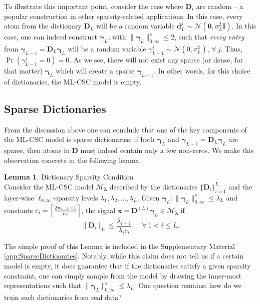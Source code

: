 \documentclass[10pt,journal]{IEEEtran}
\def\x{{\mathbf x}}
\def\d{{\mathbf d}}
\def\D{{\mathbf D}}
\def\M{{\mathcal{M}}}
\def\gama{{\boldsymbol \gamma}}
\def\lamda{{\boldsymbol \lambda}}
\theoremstyle{plain}
\theoremstyle{definition}
\newtheorem{lemma}{Lemma}
\begin{document}
To illustrate this important point, consider the case where $\D_i$ are random -- a popular construction in other sparsity-related applications. In this case, every atom from the dictionary $\D_L$ will be a random variable $\d_L^j \sim \mathcal{N}(\mathbf{0},\sigma^2_L\mathbf{I})$. In this case, one can indeed construct $\gama_L$, with $\|\gama_{L}\|^s_{0,\infty} \leq 2$, such that \emph{every entry} from $\gama_{L-1} = \D_L\gama_L$ will be a random variable $\gamma^j_{L-1}\sim \mathcal{N}(0,\sigma^2_L)$, $\forall\ j$. Thus, $\Pr\left(\gamma^j_{L-1}=0\right)=0$. As we see, there will not exist any sparse (or dense, for that matter) $\gama_L$ which will create a sparse $\gama_{L-1}$. In other words, for this choice of dictionaries, the ML-CSC model is empty.

\subsection{Sparse Dictionaries}

From the discussion above one can conclude that one of the key components of the ML-CSC model is sparse dictionaries: if both $\gama_L$ and $\gama_{L-1} = \D_L\gama_L$ are sparse, then atoms in $\D$ must indeed contain only a few non-zeros. We make this observation concrete in the following lemma.

\begin{lemma}{Dictionary Sparsity Condition}\label{lemma:SparseDictionaries} \\
	Consider the ML-CSC model $\M_\lamda$ described by the dictionaries $\{\D_i\}_{i=1}^L$ and the layer-wise $\ell_{0,\infty}$-sparsity levels $\lambda_1,\lambda_2,\dots,\lambda_L$. Given $\gama_L : \|\gama_L\|^s_{0,\infty} \leq \lambda_L$ and constants $c_i = \Bigl\lceil \frac{2n_{i-1}-1}{n_i} \Bigr\rceil$, the signal $\x = \D^{(L)} \gama_L \in \M_\lamda$ if
	\begin{equation}
		\|\D_i\|_0 \leq \frac{\lambda_{i-1}}{\lambda_i c_i}, \quad \forall\ 1<i\leq L.
	\end{equation}
\end{lemma}

The simple proof of this Lemma is included in the Supplementary Material \ref{app:SparseDictioanries}. Notably, while this claim does not tell us if a certain model is empty, it does guarantee that if the dictionaries satisfy a given sparsity constraint, one can simply sample from the model by drawing the inner-most representations such that $\|\gama_L \|^s_{0,\infty}\leq \lambda_L$. One question remains: how do we train such dictionaries from real data?
\end{document}
